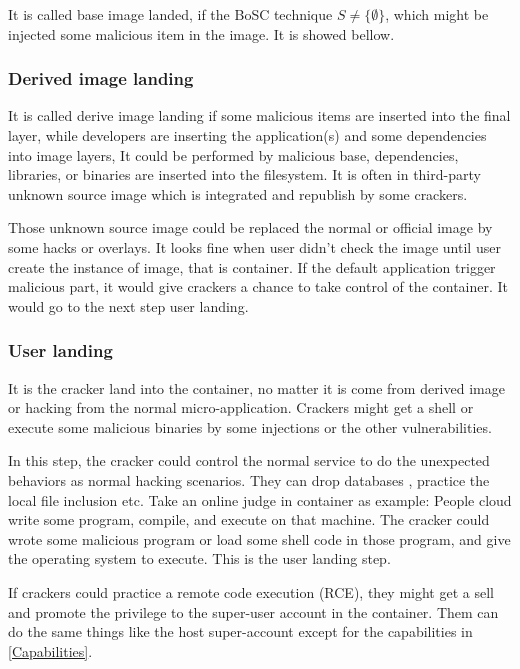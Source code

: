 
It is called base image landed, if the BoSC technique $S \neq \{\emptyset\}$, which
might be injected some malicious item in the image. It is showed bellow.


\subsubsection{Derived image landing}
It is called derive image landing if some malicious items are inserted into the final layer,
while developers are inserting the application(s) and some dependencies into image layers,
It could be performed by malicious base, dependencies, libraries, or binaries are inserted
into the filesystem. It is often in third-party unknown source image which is integrated
and republish by some crackers.

Those unknown source image could be replaced the normal or official image by some hacks or overlays.
It looks fine when user didn't check the image until user create the instance of image, that is container.
If the default application trigger malicious part, it would give crackers a chance to take control of
the container. It would go to the next step user landing.

\subsubsection{User landing}
It is the cracker land into the container, no matter it is come from derived image or hacking from
the normal micro-application. Crackers might get a shell or execute some malicious binaries by
some injections or the other vulnerabilities.

In this step, the cracker could control the normal service to do the unexpected behaviors as
normal hacking scenarios. They can drop databases \cite{halfond2006classification} , practice
the local file inclusion \cite{hassan2018saisan, whitman2011principles} etc.
Take an online judge in container as example: People cloud write some program, compile, and execute on that
machine. The cracker could wrote some malicious program or load some shell code in those program,
and give the operating system to execute. This is the user landing step.

If crackers could practice a remote code execution (RCE), they might get a sell and promote the privilege to
the super-user account in the container. Them can do the same things like the host super-account except for
the capabilities in \ref{Capabilities}.


